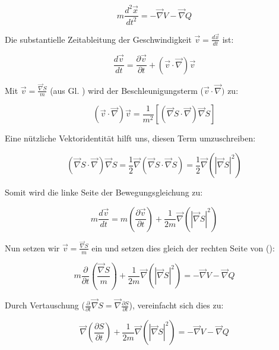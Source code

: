 \begin{equation}
    m \frac{d^2\vec{x}}{dt^2} = -\vec{\nabla} V - \vec{\nabla} Q \tag{3.1}
\end{equation}

Die substantielle Zeitableitung der Geschwindigkeit $\vec{v} = \frac{d \vec{x}}{dt}$ ist:

\begin{equation}
    \frac{d\vec{v}}{dt} = \frac{\partial \vec{v}}{\partial t} + (\vec{v} \cdot \vec{\nabla}) \vec{v}
\end{equation}

Mit $\vec{v} = \frac{\vec{\nabla} S}{m}$ (aus Gl. ) wird der Beschleunigungsterm ($\vec{v} \cdot \vec{\nabla})$ zu:

\begin{equation}
    (\vec{v} \cdot \vec{\nabla}) \vec{v} = \frac{1}{m^2} \left[ (\vec{\nabla} S \cdot \vec{\nabla}) \vec{\nabla} S \right]
\end{equation}

Eine nützliche Vektoridentität hilft uns, diesen Term umzuschreiben:

\begin{equation}
    (\vec{\nabla} S \cdot \vec{\nabla}) \vec{\nabla} S = \frac{1}{2} \vec{\nabla} (\vec{\nabla} S \cdot \vec{\nabla} S) = \frac{1}{2} \vec{\nabla} (\left|\vec{\nabla} S \right|^2)
\end{equation}

Somit wird die linke Seite der Bewegungsgleichung zu:

\begin{equation}
    m \frac{d\vec{v}}{dt} = m \left( \frac{\partial \vec{v}}{\partial t} \right) + \frac{1}{2m} \vec{\nabla} (\left| \vec{\nabla} S \right|^2)
\end{equation}

Nun setzen wir $\vec{v} = \frac{\vec{\nabla} S}{m}$ ein und setzen dies gleich der rechten Seite von ():

\begin{equation}
    m \frac{\partial}{\partial t}\left( \frac{\vec{\nabla} S}{m} \right) + \frac{1}{2m} \vec{\nabla} (\left| \vec{\nabla} S \right|^2) = -\vec{\nabla} V - \vec{\nabla} Q
\end{equation}

Durch Vertauschung ($\frac{\partial}{\partial t} \vec{\nabla} S = \vec{\nabla} \frac{\partial S}{\partial t}$), vereinfacht sich dies zu:

\begin{equation}
    \vec{\nabla} \left( \frac{\partial S}{\partial t} \right) + \frac{1}{2m} \vec{\nabla} (\left| \vec{\nabla} S \right|^2) = -\vec{\nabla} V - \vec{\nabla} Q
\end{equation}

